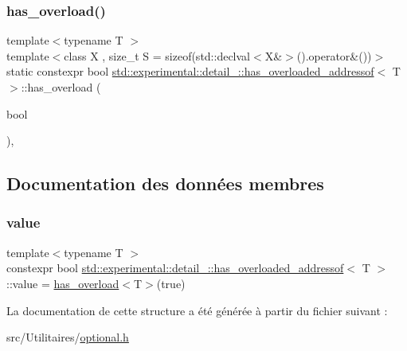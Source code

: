 \subsubsection{\texorpdfstring{has\+\_\+overload()}{has\_overload()}\hspace{0.1cm}{\footnotesize\ttfamily [2/2]}}
{\footnotesize\ttfamily template$<$typename T $>$ \\
template$<$class X , size\+\_\+t S = sizeof(std\+::declval$<$\+X\&$>$().\+operator\&())$>$ \\
static constexpr bool \hyperlink{structstd_1_1experimental_1_1detail___1_1has__overloaded__addressof}{std\+::experimental\+::detail\+\_\+\+::has\+\_\+overloaded\+\_\+addressof}$<$ T $>$\+::has\+\_\+overload (\begin{DoxyParamCaption}\item[{bool}]{ }\end{DoxyParamCaption})\hspace{0.3cm}{\ttfamily [inline]}, {\ttfamily [static]}}



\subsection{Documentation des données membres}
\mbox{\label{structstd_1_1experimental_1_1detail___1_1has__overloaded__addressof_a7ff16212ecdca54a0328b1cb4d676cf9}} 
\subsubsection{\texorpdfstring{value}{value}}
{\footnotesize\ttfamily template$<$typename T $>$ \\
constexpr bool \hyperlink{structstd_1_1experimental_1_1detail___1_1has__overloaded__addressof}{std\+::experimental\+::detail\+\_\+\+::has\+\_\+overloaded\+\_\+addressof}$<$ T $>$\+::value = \hyperlink{structstd_1_1experimental_1_1detail___1_1has__overloaded__addressof_a4656eb4d63080eef6563dca4894f8623}{has\+\_\+overload}$<$T$>$(true)\hspace{0.3cm}{\ttfamily [static]}}



La documentation de cette structure a été générée à partir du fichier suivant \+:\begin{DoxyCompactItemize}
\item 
src/\+Utilitaires/\hyperlink{optional_8h}{optional.\+h}\end{DoxyCompactItemize}
